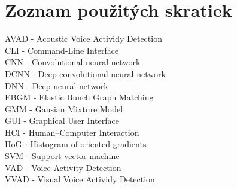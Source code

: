 \chapter*{Zoznam použitých skratiek}

\begin{center}
AVAD - Acoustic Voice Actividy Detection\\
CLI - Command-Line Interface\\
CNN - Convolutional neural network\\
DCNN - Deep convolutional neural network\\
DNN - Deep neural network\\
EBGM  - Elastic Bunch Graph Matching\\
GMM - Gausian Mixture Model\\
GUI - Graphical User Interface\\
HCI  - Human–Computer Interaction\\
HoG - Histogram of oriented gradients\\
SVM - Support-vector machine\\
VAD - Voice Activity Detection\\
VVAD - Visual Voice Actividy Detection

\end{center}